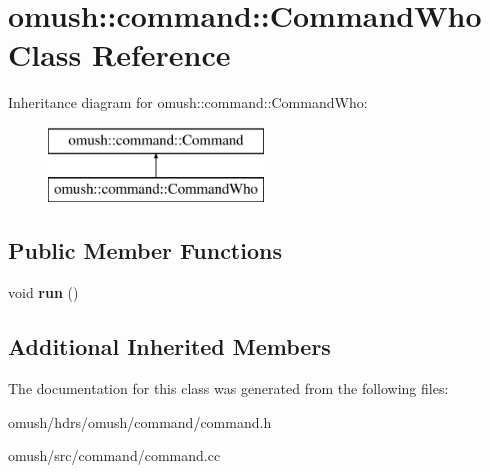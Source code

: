 \hypertarget{classomush_1_1command_1_1_command_who}{\section{omush\-:\-:command\-:\-:Command\-Who Class Reference}
\label{classomush_1_1command_1_1_command_who}
}
Inheritance diagram for omush\-:\-:command\-:\-:Command\-Who\-:\begin{figure}[H]
\begin{center}
\leavevmode
\includegraphics[height=2.000000cm]{classomush_1_1command_1_1_command_who}
\end{center}
\end{figure}
\subsection*{Public Member Functions}
\begin{DoxyCompactItemize}
\item 
\hypertarget{classomush_1_1command_1_1_command_who_a46e172ae5623a28b1ccc9bb38cab76ec}{void {\bfseries run} ()}\label{classomush_1_1command_1_1_command_who_a46e172ae5623a28b1ccc9bb38cab76ec}

\end{DoxyCompactItemize}
\subsection*{Additional Inherited Members}


The documentation for this class was generated from the following files\-:\begin{DoxyCompactItemize}
\item 
omush/hdrs/omush/command/command.\-h\item 
omush/src/command/command.\-cc\end{DoxyCompactItemize}
